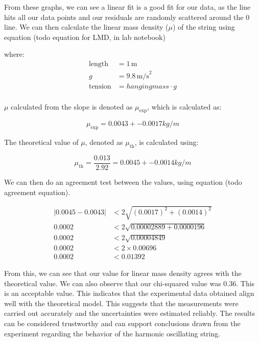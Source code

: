 \documentclass[11pt]{article}
\begin{document}
    From these graphs, we can see a linear fit is a good fit for our data, as the line hits all our data points and our residuals are randomly scattered around the 0 line. We can then calculate the linear mass density ($\mu$) of the string using equation (todo equation for LMD, in lab notebook)
    
    where:
    \begin{align*}
    \text{length} &= 1 \, \text{m} \\
    g &= 9.8 \, \text{m/s}^2 \\
    \text{tension} &= hanging mass \cdot g\\
    \end{align*}
    
    $\mu$ calculated from the slope is denoted as $\mu_{\text{exp}}$, which is calculated as:
    
    \begin{equation}
    \mu_{\text{exp}} = 0.0043 +- 0.0017 kg/m
    \end{equation}
    
    The theoretical value of $\mu$, denoted as $\mu_{\text{th}}$, is calculated using:
    
    \begin{equation}
    \mu_{\text{th}} = \frac{0.013}{2.92} = 0.0045 +- 0.0014 kg/m
    \end{equation}

    We can then do an agreement test between the values, using equation (todo agreement equation).

    \begin{align*}
    |0.0045 - 0.0043| &< 2 \sqrt{(0.0017)^2 + (0.0014)^2} \\
    0.0002 &< 2 \sqrt{0.00002889 + 0.0000196} \\
    0.0002 &< 2 \sqrt{0.00004849} \\
    0.0002 &< 2 \times 0.00696 \\
    0.0002 &< 0.01392
    \end{align*}

    From this, we can see that our value for linear mass density agrees with the theoretical value. We can also observe that our chi-squared value was 0.36. This is an acceptable value. This indicates that the experimental data obtained align well with the theoretical model. This suggests that the measurements were carried out accurately and the uncertainties were estimated reliably. The results can be considered trustworthy and can support conclusions drawn from the experiment regarding the behavior of the harmonic oscillating string. 
\end{document}

